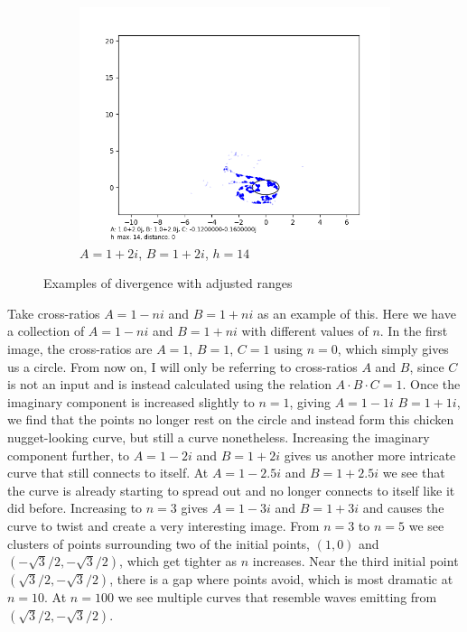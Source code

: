 \documentclass[12pt,a4paper,reqno,parskip=full]{amsart}
\numberwithin{equation}{section}
\theoremstyle{plain}
\theoremstyle{definition}
\begin{document}
\begin{figure}[H]
\begin{subfigure}[b]{\textwidth}
        \includegraphics[width=.49\textwidth]{images/a2b2/a2,b2,h14,d0.png}
         \caption{$A=1+2i$, $B=1+2i$, $h=14$}
         \label{fig:a2b2h14range}
     \end{subfigure}
        \caption{Examples of divergence with adjusted ranges}
        \label{fig:divergence-with-ranges}
\end{figure}

Take cross-ratios $A=1-ni$ and $B=1+ni$ as an example of this. Here we have a collection of $A=1-ni$ and $B=1+ni$ with different values of $n$. In the first image, the cross-ratios are $A=1$, $B=1$, $C=1$ using $n=0$, which simply gives us a circle. From now on, I will only be referring to cross-ratios $A$ and $B$, since $C$ is not an input and is instead calculated using the relation $A\cdot B\cdot C=1$. Once the imaginary component is increased slightly to $n=1$, giving $A=1-1i$ $B=1+1i$, we find that the points no longer rest on the circle and instead form this chicken nugget-looking curve, but still a curve nonetheless. Increasing the imaginary component further, to $A=1-2i$ and $B=1+2i$ gives us another more intricate curve that still connects to itself. At $A=1-2.5i$ and $B=1+2.5i$ we see that the curve is already starting to spread out and no longer connects to itself like it did before. Increasing to $n=3$ gives $A=1-3i$ and $B=1+3i$ and causes the curve to twist and create a very interesting image. From $n=3$ to $n=5$ we see clusters of points surrounding two of the initial points, $(1,0)$ and $(-\sqrt3/2,-\sqrt3/2)$, which get tighter as $n$ increases. Near the third initial point $(\sqrt3/2,-\sqrt3/2)$, there is a gap where points avoid, which is most dramatic at $n=10$. At $n=100$ we see multiple curves that resemble waves emitting from $(\sqrt3/2,-\sqrt3/2)$.
\end{document}
